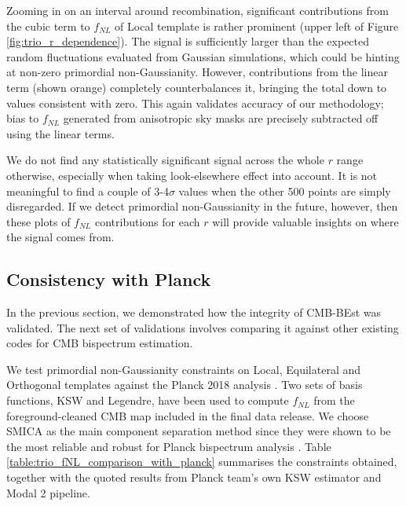 Zooming in on an interval around recombination, significant contributions from the cubic term to $f_{NL}$ of Local template is rather prominent (upper left of Figure \ref{fig:trio_r_dependence}). The signal is sufficiently larger than the expected random fluctuations evaluated from Gaussian simulations, which could be hinting at non-zero primordial non-Gaussianity. However, contributions from the linear term (shown orange) completely counterbalances it, bringing the total down to values consistent with zero. This again validates accuracy of our methodology; bias to $f_{NL}$ generated from anisotropic sky masks are precisely subtracted off using the linear terms.

We do not find any statistically significant signal across the whole $r$ range otherwise, especially when taking look-elsewhere effect into account. It is not meaningful to find a couple of 3-4$\sigma$ values when the other 500 points are simply disregarded. If we detect primordial non-Gaussianity in the future, however, then these plots of $f_{NL}$ contributions for each $r$ will provide valuable insights on where the signal comes from.



\subsection{Consistency with Planck} \label{section:consistency_with_Planck}

In the previous section, we demonstrated how the integrity of CMB-BEst was validated. The next set of validations involves comparing it against other existing codes for CMB bispectrum estimation.

We test primordial non-Gaussianity constraints on Local, Equilateral and Orthogonal templates against the Planck 2018 analysis \cite{PlanckCollaboration2018}. Two sets of basis functions, KSW and Legendre, have been used to compute $f_{NL}$ from the foreground-cleaned CMB map included in the final data release. We choose SMICA as the main component separation method since they were shown to be the most reliable and robust for Planck bispectrum analysis \cite{PlanckCollaboration2013ComponentSeparation, PlanckCollaboration2013,PlanckCollaboration2015,PlanckCollaboration2018}. Table \ref{table:trio_fNL_comparison_with_planck} summarises the constraints obtained, together with the quoted results from Planck team's own KSW estimator and Modal 2 pipeline.

